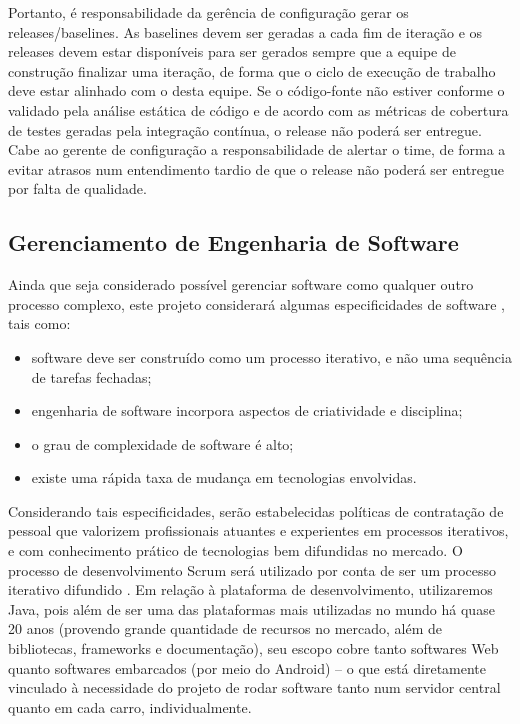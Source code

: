 \documentclass[12pt,journal,compsoc]{IEEEtran}
\begin{document}
Portanto, é responsabilidade da gerência de configuração gerar os releases/baselines. As baselines devem ser geradas a cada fim de iteração e os releases devem estar disponíveis para ser gerados sempre que a equipe de construção finalizar uma iteração, de forma que o ciclo de execução de trabalho deve estar alinhado com o desta equipe. Se o código-fonte não estiver conforme o validado pela análise estática de código e de acordo com as métricas de cobertura de testes geradas pela integração contínua, o release não poderá ser entregue. Cabe ao gerente de configuração a responsabilidade de alertar o time, de forma a evitar atrasos num entendimento tardio de que o release não poderá ser entregue por falta de qualidade.


\subsection{Gerenciamento de Engenharia de Software}

Ainda que seja considerado possível gerenciar software como qualquer outro processo complexo, este projeto considerará algumas especificidades de software \cite{society_software_2004}, tais como: 

\begin{itemize}
\item software deve ser construído como um processo iterativo, e não uma sequência de tarefas fechadas;
\item engenharia de software incorpora aspectos de criatividade e disciplina;
\item o grau de complexidade de software é alto;
\item existe uma rápida taxa de mudança em tecnologias envolvidas. 
\end{itemize}

Considerando tais especificidades, serão estabelecidas políticas de contratação de pessoal que valorizem profissionais atuantes e experientes em processos iterativos, e com conhecimento prático de tecnologias bem difundidas no mercado. O processo de desenvolvimento Scrum será utilizado por conta de ser um processo iterativo difundido \cite{scrum_development_process}. Em relação à plataforma de desenvolvimento, utilizaremos Java, pois além de ser uma das plataformas mais utilizadas no mundo há quase 20 anos \cite{tiobe_language} (provendo grande quantidade de recursos no mercado, além de bibliotecas, frameworks e documentação), seu escopo cobre tanto softwares Web quanto softwares embarcados (por meio do Android) -- o que está diretamente vinculado à necessidade do projeto de rodar software tanto num servidor central quanto em cada carro, individualmente.
\end{document}
